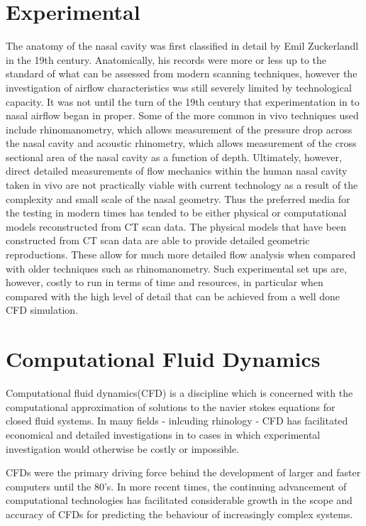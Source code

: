 \section{Experimental}
The anatomy of the nasal cavity was first classified in detail by Emil Zuckerlandl in the 19th century\cite{Stammberger1989}. Anatomically, his records were more or less up to the standard of what can be assessed from modern scanning techniques\cite{Stammberger1989}, however the investigation of airflow characteristics was still severely limited by technological capacity\cite{Eccles2000}. It was not until the turn of the 19th century that experimentation in to nasal airflow began in proper\cite{Eccles2000}. Some of the more common in vivo techniques used include rhinomanometry, which allows measurement of the pressure drop across the nasal cavity\cite{Hilberg1989} and acoustic rhinometry, which allows measurement of the cross sectional area of the nasal cavity as a function of depth\cite{Hilberg1989}. Ultimately, however, direct detailed measurements of flow mechanics within the human nasal cavity taken in vivo are not practically viable with current technology as a result of the complexity and small scale of the nasal geometry\cite{Doorly2008c}. Thus the preferred media for the testing in modern times has tended to be either physical or computational models reconstructed from CT scan data\cite{Doorly2008c}. The physical models that have been constructed from CT scan data are able to provide detailed geometric reproductions. These allow for much more detailed flow analysis when compared with older techniques such as rhinomanometry\cite{Ma2009}. Such experimental set ups are, however, costly to run in terms of time and resources, in particular when compared with the high level of detail that can be achieved from a well done CFD simulation\cite{Ma2009}.

\section{Computational Fluid Dynamics}
Computational fluid dynamics(CFD) is a discipline which is concerned with the computational approximation of solutions to the navier stokes equations for closed fluid systems\cite{Tu2008}. In many fields - inlcuding rhinology - CFD has facilitated economical and detailed investigations in to cases in which experimental investigation would otherwise be costly or impossible\cite{Keyhani1995}.

CFDs were the primary driving force behind the development of larger and faster computers until the 80's\cite{Wendt2009}. In more recent times, the continuing advancement of computational technologies has facilitated considerable growth in the scope and accuracy of CFDs for predicting the behaviour of increasingly complex systems\cite{Tu2008}. 

